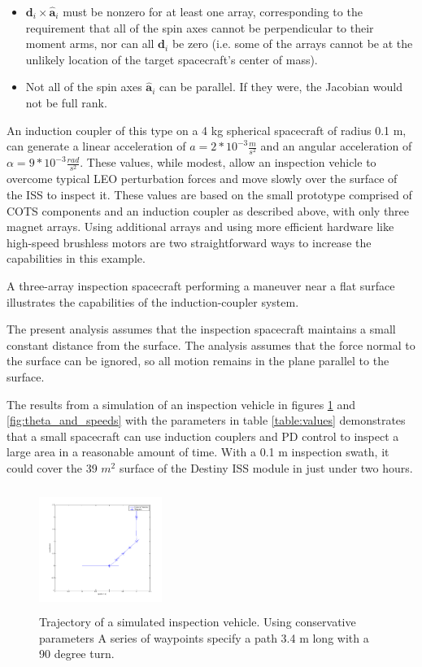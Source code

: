 \begin{itemize}
\item  $\boldsymbol{d}_i{\times}\hat{\boldsymbol{a}}_i$ must be nonzero for at least one array, corresponding to the requirement that all of the spin axes cannot be perpendicular to their moment arms, nor can all $\boldsymbol{d}_i$ be zero (i.e. some of the arrays cannot be at the unlikely location of the target spacecraft's center of mass).
\item  Not all of the spin axes $\hat{\boldsymbol{a}}_i$ can be parallel. If they were, the Jacobian would not be full rank.
\end{itemize}

An induction coupler of this type on a 4 kg spherical spacecraft of radius 0.1 m, can generate a linear acceleration of
$a = 2*10^{-3} \frac{m}{s^2}$ 
and an angular acceleration of 
$\alpha = 9*10^{-3} \frac{rad}{s^2}$. 
These values, while modest, allow an inspection vehicle to overcome typical LEO perturbation forces
\cite{wertz2011space}
 and move slowly over the surface of the ISS to inspect it. These values are based on the small prototype comprised of COTS components and an induction coupler as described above, with only three magnet arrays. Using additional arrays and using more efficient hardware like high-speed brushless motors are two straightforward ways to increase the capabilities in this example.

A three-array inspection spacecraft performing a maneuver near a flat surface illustrates the capabilities of the induction-coupler system. 

The present analysis assumes that the inspection spacecraft maintains a small constant distance from the surface. The analysis assumes that the force normal to the surface can be ignored, so all motion remains in the plane parallel to the surface. 

The results from a simulation of an inspection vehicle in figures \ref{fig:trajectory} and \ref{fig:theta_and_speeds} with the parameters in table \ref{table:values} demonstrates that a small spacecraft can use induction couplers and PD control to inspect a large area in a 
reasonable amount of time. With a 0.1 m inspection swath, it could cover the 39 $m^2$ surface of the Destiny ISS module in just under two hours.   

\begin{figure}

\includegraphics[width = 4cm, height = 4cm ]{figures/planar_trajectory.png}
\caption{Trajectory of a simulated inspection vehicle. Using conservative parameters A series of waypoints specify a path 3.4 m long with a 90 degree turn. }
\label{fig:trajectory}
\end{figure}

